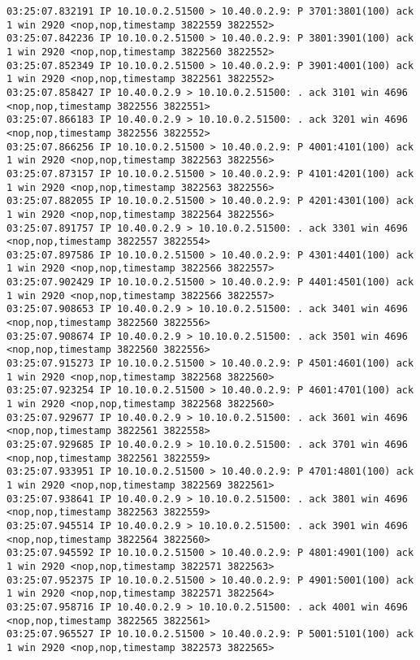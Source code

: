 \documentclass[a4paper,12pt]{article}
\begin{document}
\begin{lstlisting}
03:25:07.832191 IP 10.10.0.2.51500 > 10.40.0.2.9: P 3701:3801(100) ack 1 win 2920 <nop,nop,timestamp 3822559 3822552>
03:25:07.842236 IP 10.10.0.2.51500 > 10.40.0.2.9: P 3801:3901(100) ack 1 win 2920 <nop,nop,timestamp 3822560 3822552>
03:25:07.852349 IP 10.10.0.2.51500 > 10.40.0.2.9: P 3901:4001(100) ack 1 win 2920 <nop,nop,timestamp 3822561 3822552>
03:25:07.858427 IP 10.40.0.2.9 > 10.10.0.2.51500: . ack 3101 win 4696 <nop,nop,timestamp 3822556 3822551>
03:25:07.866183 IP 10.40.0.2.9 > 10.10.0.2.51500: . ack 3201 win 4696 <nop,nop,timestamp 3822556 3822552>
03:25:07.866256 IP 10.10.0.2.51500 > 10.40.0.2.9: P 4001:4101(100) ack 1 win 2920 <nop,nop,timestamp 3822563 3822556>
03:25:07.873157 IP 10.10.0.2.51500 > 10.40.0.2.9: P 4101:4201(100) ack 1 win 2920 <nop,nop,timestamp 3822563 3822556>
03:25:07.882055 IP 10.10.0.2.51500 > 10.40.0.2.9: P 4201:4301(100) ack 1 win 2920 <nop,nop,timestamp 3822564 3822556>
03:25:07.891757 IP 10.40.0.2.9 > 10.10.0.2.51500: . ack 3301 win 4696 <nop,nop,timestamp 3822557 3822554>
03:25:07.897586 IP 10.10.0.2.51500 > 10.40.0.2.9: P 4301:4401(100) ack 1 win 2920 <nop,nop,timestamp 3822566 3822557>
03:25:07.902429 IP 10.10.0.2.51500 > 10.40.0.2.9: P 4401:4501(100) ack 1 win 2920 <nop,nop,timestamp 3822566 3822557>
03:25:07.908653 IP 10.40.0.2.9 > 10.10.0.2.51500: . ack 3401 win 4696 <nop,nop,timestamp 3822560 3822556>
03:25:07.908674 IP 10.40.0.2.9 > 10.10.0.2.51500: . ack 3501 win 4696 <nop,nop,timestamp 3822560 3822556>
03:25:07.915273 IP 10.10.0.2.51500 > 10.40.0.2.9: P 4501:4601(100) ack 1 win 2920 <nop,nop,timestamp 3822568 3822560>
03:25:07.923254 IP 10.10.0.2.51500 > 10.40.0.2.9: P 4601:4701(100) ack 1 win 2920 <nop,nop,timestamp 3822568 3822560>
03:25:07.929677 IP 10.40.0.2.9 > 10.10.0.2.51500: . ack 3601 win 4696 <nop,nop,timestamp 3822561 3822558>
03:25:07.929685 IP 10.40.0.2.9 > 10.10.0.2.51500: . ack 3701 win 4696 <nop,nop,timestamp 3822561 3822559>
03:25:07.933951 IP 10.10.0.2.51500 > 10.40.0.2.9: P 4701:4801(100) ack 1 win 2920 <nop,nop,timestamp 3822569 3822561>
03:25:07.938641 IP 10.40.0.2.9 > 10.10.0.2.51500: . ack 3801 win 4696 <nop,nop,timestamp 3822563 3822559>
03:25:07.945514 IP 10.40.0.2.9 > 10.10.0.2.51500: . ack 3901 win 4696 <nop,nop,timestamp 3822564 3822560>
03:25:07.945592 IP 10.10.0.2.51500 > 10.40.0.2.9: P 4801:4901(100) ack 1 win 2920 <nop,nop,timestamp 3822571 3822563>
03:25:07.952375 IP 10.10.0.2.51500 > 10.40.0.2.9: P 4901:5001(100) ack 1 win 2920 <nop,nop,timestamp 3822571 3822564>
03:25:07.958716 IP 10.40.0.2.9 > 10.10.0.2.51500: . ack 4001 win 4696 <nop,nop,timestamp 3822565 3822561>
03:25:07.965527 IP 10.10.0.2.51500 > 10.40.0.2.9: P 5001:5101(100) ack 1 win 2920 <nop,nop,timestamp 3822573 3822565>

\end{lstlisting}
\end{document}
